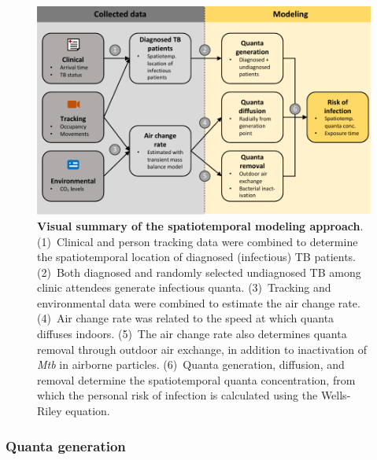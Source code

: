 \documentclass[fleqn,11pt]{wlscirep}
\begin{document}
\begin{figure}[!htpb]
    \centering
    \includegraphics{doc/model-flow-chart.pdf}
    \caption{\textbf{Visual summary of the spatiotemporal modeling approach}. (1)~Clinical and person tracking data were combined to determine the spatiotemporal location of diagnosed (infectious) TB patients. (2)~Both diagnosed and randomly selected undiagnosed  TB among clinic attendees generate infectious quanta. (3)~Tracking and environmental data were combined to estimate the air change rate. (4)~Air change rate was related to the speed at which quanta diffuses indoors. (5)~The air change rate also determines quanta removal through outdoor air exchange, in addition to inactivation of \emph{Mtb} in airborne particles. (6)~Quanta generation, diffusion, and removal determine the spatiotemporal quanta concentration, from which the personal risk of infection is calculated using the Wells-Riley equation.}
    \label{fig:modeling-flow}
\end{figure}

\subsubsection*{Quanta generation}
\end{document}
